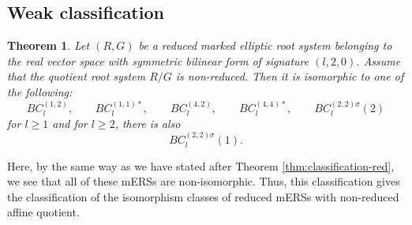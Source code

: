 \documentclass[11pt]{amsart}
\newtheorem{thm}{Theorem}[section]
\begin{document}

\subsection{Weak classification}\label{sect:Classification-weak}

\begin{thm}\label{thm_classification-reduced} 
Let $(R,G)$ be a reduced marked elliptic root system belonging to the real vector space
with symmetric bilinear form of signature $(l,2,0)$. Assume that the quotient root system $R/G$ is non-reduced. Then it is isomorphic to one of the following:
\[ BC_l^{(1,2)}, \qquad BC_l^{(1,1)\ast}, \qquad BC_l^{(4,2)}, \qquad BC_l^{(4,4)\ast},  \qquad  BC_l^{(2,2)\sigma}(2) \]
for $l\geq 1$ and for $l\geq 2$, there is also 
\[ BC_l^{(2,2)\sigma}(1). \] 
\end{thm}
Here, by the same way as we have stated after Theorem \ref{thm:classification-red}, we see that all of these mERSs are non-isomorphic. Thus, this classification gives the classification of the isomorphism classes of reduced mERSs with non-reduced affine quotient. 
\end{document}
